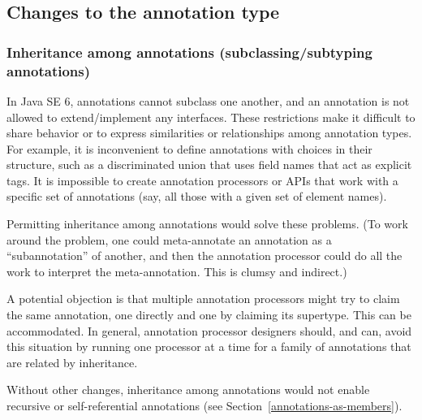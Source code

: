 \documentclass[10pt]{article}
\begin{document}
\subsection{Changes to the annotation type\label{changes-to-the-annotation-type}}


\subsubsection{Inheritance among annotations (subclassing/subtyping annotations)\label{inheritance-among-annotations}}


In Java SE 6, annotations cannot subclass one another, and an annotation is not allowed
to extend/implement any interfaces.  These restrictions make it difficult
to share behavior or to express similarities or relationships among
annotation types.  For example, it is inconvenient to define annotations
with choices in their structure, such as a discriminated union that uses
field names that act as explicit tags.  It is impossible to create
annotation processors or APIs that work with a specific set of annotations
(say, all those with a given set of element names).

Permitting inheritance among annotations would solve these problems.  (To
work around the problem, one could meta-annotate an annotation as a
``subannotation'' of another, and then the annotation processor could do
all the work to interpret the meta-annotation.  This is clumsy and
indirect.)

A potential objection is that multiple annotation processors might try to
claim the same annotation, one directly and one by claiming its supertype.
This can be accommodated.  In general, annotation processor designers
should, and can, avoid this situation by running one processor at a time
for a family of annotations that are related by inheritance.



Without other changes, inheritance among annotations would not enable
recursive or self-referential annotations (see
Section~\ref{annotations-as-members}).
\end{document}

